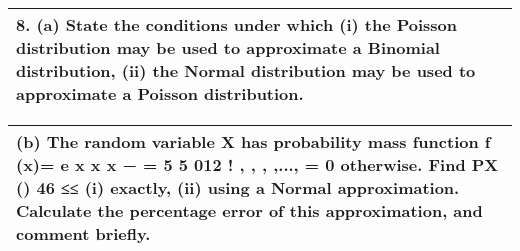 \documentclass[a4paper,12pt]{article}
\begin{document}
\begin{table}[ht!]
     \centering
     \begin{tabular}{|p{15cm}|}
     \hline        
8. (a) State the conditions under which
(i) the Poisson distribution may be used to approximate a Binomial distribution,
(ii) the Normal distribution may be used to approximate a Poisson distribution.
\\ \hline
      \end{tabular}
    \end{table}
    
  \begin{table}[ht!]
     \centering
     \begin{tabular}{|p{15cm}|}
     \hline  
(b) The random variable X has probability mass function
f (x)= e
x
x
x
−
=
5 5
012
!
, , , ,...,
= 0  otherwise.
Find PX () 46 ≤≤ (i) exactly, (ii) using a Normal approximation.  Calculate the percentage error of this approximation, and comment briefly.
\\ \hline 
      \end{tabular}
    \end{table}
\end{document}
